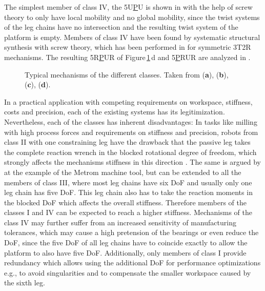 \documentclass[robotics,article,accept,moreauthors,pdftex]{Definitions/mdpi}
\begin{document}
The simplest member of class IV, the 5U\underline{P}U is shown in \cite{HuangLi2002} with the help of screw theory to only have local mobility and no global mobility, since the twist systems of the leg chains have no intersection and the resulting twist system of the platform is empty.
Members of class IV have been found by systematic structural synthesis with screw theory, which has been performed in \cite{KongGos2005} for symmetric 3T2R mechanisms.
The resulting 5R\underline{P}UR of Figure\,\ref{fig:systems_pictures}\,d and 5\underline{P}RUR are analyzed in \cite{Tale-MasoulehGos2011,Tale-MasoulehSaaGosTag2010}.
%
\begin{figure}[h!]
	
	\caption{Typical mechanisms of the different classes. Taken from \cite{ZhangGos2001} (\textbf{a}), \cite{MbarekNefCor2005} (\textbf{b}), \cite{AlaghebandMahMilBen2015} (\textbf{c}), \cite{Tale-MasoulehGos2011} (\textbf{d}).}
	\label{fig:systems_pictures}
\end{figure} 

In a practical application with competing requirements on workspace, stiffness, costs and precision, each of the existing systems has its legitimization.
Nevertheless, each of the classes has inherent disadvantages:
In tasks like milling with high process forces and requirements on stiffness and precision, robots from class II with one constraining leg have the drawback that the passive leg takes the complete reaction wrench in the blocked rotational degree of freedom, which strongly affects the mechanisms stiffness in this direction \cite{ZhangGos2001}.
The same is argued by \cite{LinLiYanZha2013} at the example of the Metrom machine tool, but can be extended to all the members of class III, where most leg chains have six DoF and usually only one leg chain has five DoF.
This leg chain also has to take the reaction moments in the blocked DoF which affects the overall stiffness.
Therefore\added[id=Sp]{,} members of the classes I and IV can be expected to reach a higher stiffness.
Mechanisms of the class IV may further suffer from an increased sensitivity of manufacturing tolerances, which may cause a high pretension of the bearings or even reduce the DoF, since the five DoF of all leg chains have to coincide exactly to allow the platform to also have five DoF.
Additionally, only members of class I provide redundancy which allows using the additional DoF for performance optimizations\added[id=Sp]{,} e.g., to avoid singularities and to compensate the smaller workspace caused by the sixth leg.
\end{document}
